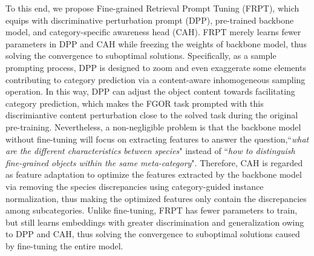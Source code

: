 \documentclass[letterpaper]{article} %
\begin{document}
To this end, we propose Fine-grained Retrieval Prompt Tuning (FRPT), which equips with  discriminative perturbation prompt (DPP), pre-trained backbone model, and category-specific awareness head (CAH). 
FRPT merely learns fewer parameters in DPP and CAH while freezing the weights of backbone model, thus solving the convergence to suboptimal solutions. 
Specifically, as a sample prompting process, DPP is designed to zoom and even exaggerate some elements contributing to category prediction via a content-aware inhomogeneous sampling operation.
In this way, DPP can adjust the object content towards facilitating category prediction, which makes the FGOR task prompted with this discrimiantive content perturbation close to the solved task during the original pre-training.
Nevertheless, a non-negligible problem is that the backbone model without fine-tuning will focus on extracting features to answer the question,``{\it what are the different characteristics between species}" instead of ``{\it how to distinguish fine-grained objects within the same meta-category}". 
Therefore, CAH is regarded as feature adaptation to optimize the features extracted by the backbone model via removing the species discrepancies using category-guided instance normalization, thus making the optimized features only contain the discrepancies among subcategories.
Unlike fine-tuning, FRPT has fewer parameters to train, but still learns embeddings with greater discrimination and generalization owing to DPP and CAH, thus solving the convergence to suboptimal solutions caused by fine-tuning the entire model. 

\end{document}
